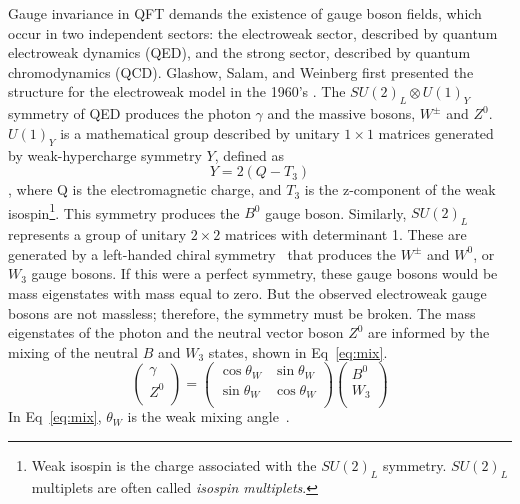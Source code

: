 Gauge invariance in QFT demands the existence of gauge boson fields, which occur in two independent sectors: the electroweak sector, described by quantum electroweak dynamics (QED), and the strong sector, described by quantum chromodynamics (QCD).  Glashow, Salam, and Weinberg first presented the structure for the electroweak model in the 1960's \cite{Glashow:1961tr, PhysRevLett.19.1264, Salam:1968rm}.  The $SU(2)_L\otimes U(1)_Y$ symmetry of QED produces the photon $\gamma$ and the massive bosons, $W^\pm$ and $Z^0$.  $U(1)_Y$ is a mathematical group described by unitary $1\times1$ matrices generated by weak-hypercharge symmetry $Y$, defined as 
\begin{equation}
Y=  2(Q-T_3)
\label{eq:Y}
\end{equation}
, where Q is the electromagnetic charge, and $T_3$ is the z-component of the weak isospin\footnote{Weak isospin is the charge associated with the $SU(2)_L$ symmetry.  $SU(2)_L$ multiplets are often called \textit{isospin multiplets}.}.   This symmetry produces the $B^0$ gauge boson.  Similarly, $SU(2)_L$ represents a group of unitary $2\times2$ matrices with determinant 1.  These are generated by a left-handed chiral symmetry~\cite{koch} that produces the $W^{\pm}$ and $W^0$, or $W_3$ gauge bosons.  If this were a perfect symmetry, these gauge bosons would be mass eigenstates with mass equal to zero. But the observed electroweak gauge bosons are not massless; therefore, the symmetry must be broken.  The mass eigenstates of the photon and the neutral vector boson $Z^0$ are informed by the mixing of the neutral $B$ and $W_3$ states, shown in Eq~\ref{eq:mix}.
\begin{equation}
\begin{pmatrix}
\gamma \\
Z^0 \\
\end{pmatrix}
=
\begin{pmatrix}
\cos\theta_W & \sin\theta_W\\
\sin\theta_W & \cos\theta_W\\
\end{pmatrix}
\begin{pmatrix}
B^0 \\
W_3 \\
\end{pmatrix}
\label{eq:mix}
\end{equation}
In Eq~\ref{eq:mix}, $\theta_W$ is the weak mixing angle~\cite{BILENKY198273}.  

